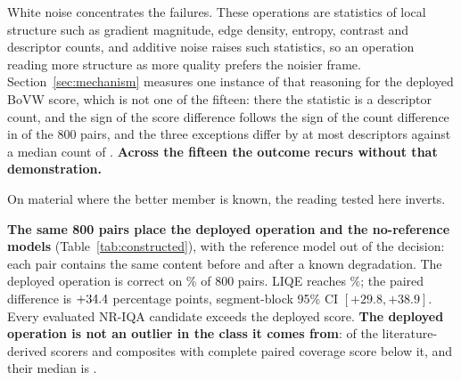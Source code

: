 White noise concentrates the failures. These operations are statistics of local structure
such as gradient magnitude, edge density, entropy, contrast and descriptor counts, and
additive noise raises such statistics, so an operation reading more structure as more
quality prefers the noisier frame. Section~\ref{sec:mechanism} measures one instance of that
reasoning for the deployed BoVW score, which is not one of the fifteen: there the statistic
is a descriptor count, and the sign of the score difference follows the sign of the count difference in \mecConcordam{} of the 800
pairs, and the three exceptions differ by at most \excDelta{} descriptors against a median
count of \excMediana{}. \textbf{Across the fifteen the outcome recurs without that demonstration.}

On material where the better member is known, the reading tested here inverts.

\textbf{The same 800 pairs place the deployed operation and the no-reference models}
(Table~\ref{tab:constructed}), with the reference model out of the decision: each pair
contains the same content before and after a known degradation. The deployed operation is correct on \mchImplantada{}\% of 800 pairs. LIQE reaches
\mchLiqe{}\%; the paired difference is $+34.4{}$ percentage points, segment-block 95\% CI
$[+29.8,+38.9]$. Every evaluated NR-IQA candidate exceeds the deployed score. \textbf{The deployed
operation is not an outlier in the class it comes from}: \tipAbaixo{} of the \tipDe{} literature-derived scorers and composites with complete
paired coverage score below it, and their median is \tipMediana{}.

